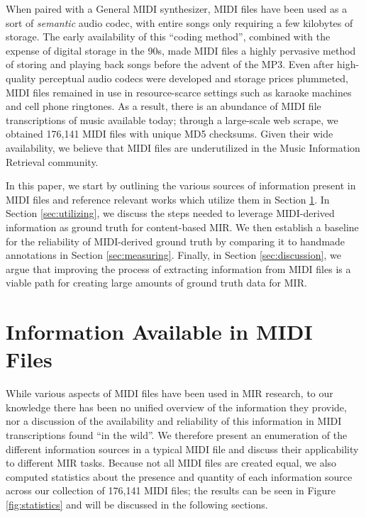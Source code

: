 \documentclass{article}
\begin{document}
When paired with a General MIDI synthesizer, MIDI files have been used as a sort of {\em semantic} audio codec, with entire songs only requiring a few kilobytes of storage.
The early availability of this ``coding method'', combined with the expense of digital storage in the 90s, made MIDI files a highly pervasive method of storing and playing back songs before the advent of the MP3.
Even after high-quality perceptual audio codecs were developed and storage prices plummeted, MIDI files remained in use in resource-scarce settings such as karaoke machines and cell phone ringtones.
As a result, there is an abundance of MIDI file transcriptions of music available today; through a large-scale web scrape, we obtained 176,141 MIDI files with unique MD5 checksums.  
Given their wide availability, we believe that MIDI files are underutilized in the Music Information Retrieval community.

In this paper, we start by outlining the various sources of information present in MIDI files and reference relevant works which utilize them in Section \ref{sec:information}.
In Section \ref{sec:utilizing}, we discuss the steps needed to leverage MIDI-derived information as ground truth for content-based MIR.
We then establish a baseline for the reliability of MIDI-derived ground truth by comparing it to handmade annotations in Section \ref{sec:measuring}.
Finally, in Section \ref{sec:discussion}, we argue that improving the process of extracting information from MIDI files is a viable path for creating large amounts of ground truth data for MIR.

\section{Information Available in MIDI Files}
\label{sec:information}

While various aspects of MIDI files have been used in MIR research, to our knowledge there has been no unified overview of the information they provide, nor a discussion of the availability and reliability of this information in MIDI transcriptions found ``in the wild''.
We therefore present an enumeration of the different information sources in a typical MIDI file and discuss their applicability to different MIR tasks.
Because not all MIDI files are created equal, we also computed statistics about the presence and quantity of each information source across our collection of 176,141 MIDI files; the results can be seen in Figure \ref{fig:statistics} and will be discussed in the following sections.
\end{document}

